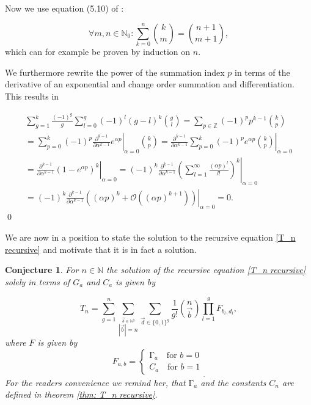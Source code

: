 \documentclass[b5paper,draft,openbib,12pt]{memoir}
\newtheorem{Conj}[Def]{Conjecture}
\begin{document}
Now we use equation (5.10) of \cite{graham1994concrete}:

\begin{equation}\tag{upper summation}
\forall m,n\in\mathbb{N}_0: \sum_{k=0}^n \binom{k}{m} = \binom{n+1}{m+1},
\end{equation}
which can for example be proven by induction on \(n\).

We furthermore rewrite the power of the summation index \(p\) in terms of the derivative of an 
exponential and change order summation and differentiation. This results in

\begin{multline*}
\sum_{g=1}^k \frac{(-1)^g}{g} \sum_{l=0}^g (-1)^l (g-l)^k \binom{g}{l}
=\sum_{p\in\mathbb{Z}} (-1)^{p} p^{k-1}  \binom{k}{p}\\
=\sum_{p=0}^k (-1)^{p} \left. \frac{\partial^{k-1}}{\partial \alpha^{k-1}} e^{\alpha p}\right|_{\alpha=0}  \binom{k}{p}
=\left. \frac{\partial^{k-1}}{\partial \alpha^{k-1}}  \sum_{p=0}^k (-1)^{p} e^{\alpha p} \binom{k}{p}\right|_{\alpha=0} \\
=\left. \frac{\partial^{k-1}}{\partial \alpha^{k-1}}  \left( 1-e^{\alpha p}\right)^k \right|_{\alpha=0} 
=(-1)^k \left. \frac{\partial^{k-1}}{\partial \alpha^{k-1}} \left( \sum_{l=1}^\infty \frac{(\alpha p)^l}{l!} \right) ^k \right|_{\alpha=0} \\
=(-1)^k \left. \frac{\partial^{k-1}}{\partial \alpha^{k-1}} ((\alpha p)^k + \mathcal{O} ((\alpha p)^{k+1}) ) \right|_{\alpha=0} =0.
\end{multline*}
\qed




We are now in a position to state the solution to the recursive equation \eqref{T_n recursive}
and motivate that it is in fact a solution. 

\begin{Conj}
For \(n\in\mathbb{N}\) the solution of the recursive equation \eqref{T_n recursive} 
solely in terms of \(G_a\) and \(C_a\) is given by

\begin{equation}\label{recursive solution}
T_n = \sum_{g=1}^n \sum_{\stackrel{\vec{b}\in\mathbb{N}^g}{|\vec{b}|= n}} \sum_{\vec{d}\in {\{0,1\}}^g} 
\frac{1}{g!} \binom{n}{\vec{b}} \prod_{l=1}^g F_{b_l,d_l},
\end{equation}
where \(F\) is given by
\begin{equation}\label{eq resursive weak solution}
F_{a,b} = \left\{ \begin{matrix}\mathrm\Gamma_a \quad \text{for } b=0 \\ C_a \quad \text{for } b=1  \end{matrix} \right._. 
\end{equation}
For the readers convenience we remind her, that \(\mathrm\Gamma_a\) and
the constants \(C_n\) are defined in theorem \ref{thm: T_n recursive}. 
\end{Conj}
\end{document}
